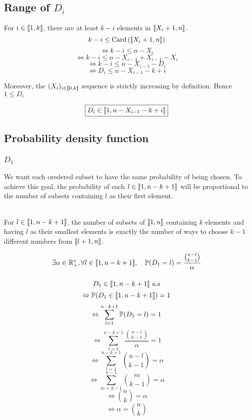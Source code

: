 \subsection{Range of $D_i$}
	
	For $i\in\llbracket1, k\rrbracket$, there are at least $k - i$ elements in $\llbracket X_i + 1, n\rrbracket$.
	\[k - i \leq \text{Card}\left(\llbracket X_i + 1, n\rrbracket\right)\]
	\[\Leftrightarrow k - i \leq n - X_i\]
	\[\Leftrightarrow k - i \leq n - X_{i - 1} + X_{i - 1} - X_i\]
	\[\Leftrightarrow k - i \leq n - X_{i - 1} - D_i\]
	\[\Leftrightarrow D_i \leq n - X_{i - 1} - k + i\]
	\[\]
	
	Moreover, the $(X_i)_{i\in\llbracket0, k\rrbracket}$ sequence is strictly increasing by definition. Hence $1 \leq D_i$
	
	\[\boxed{D_i\in\llbracket1, n - X_{i - 1} - k + i\rrbracket}\]
	
\subsection{Probability density function}
	\subsubsection{$D_1$}
		
		We want each oredered subset to have the same probability of being chosen. To achieve this goal, the probability of each $l\in\llbracket1, n - k + 1\rrbracket$ will be proportional to the number of subsets containing $l$ as their first element.\\\
		
		For $l\in \llbracket1, n - k + 1\rrbracket$, the number of subsets of $\llbracket1, n\rrbracket$ containing $k$ elements and having $l$ as their smallest elements is exactly the number of ways to choose $k - 1$ different numbers from $\llbracket l + 1, n\rrbracket$.
		
		\[\exists\alpha\in\mathbb{R}_+^*, \forall l\in\llbracket1, n - k + 1\rrbracket, \quad \mathbb{P}(D_1 = l) = \frac{\binom{n - l}{k - 1}}{\alpha}\]
		\[\]
		
		\[D_1\in\llbracket1, n - k + 1\rrbracket \text{ a.s}\]
		\[\Leftrightarrow \mathbb{P}(D_1\in\llbracket1, n - k + 1\rrbracket) = 1\]
		\[\Leftrightarrow \sum_{l = 1}^{n - k + 1}{\mathbb{P}(D_1 = l)} = 1\]
		\[\Leftrightarrow \sum_{l = 1}^{n - k + 1}{\frac{\binom{n - l}{k - 1}}{\alpha}} = 1\]
		\[\Leftrightarrow \sum_{l = 1}^{n - k + 1}{\binom{n - l}{k - 1}} = \alpha\]
		\[\Leftrightarrow \sum_{m = k - 1}^{n - 1}{\binom{m}{k - 1}} = \alpha\]
		\[\Leftrightarrow \binom{n}{k} = \alpha\]
		\[\Leftrightarrow \alpha = \binom{n}{k}\]
		\[\]
		
